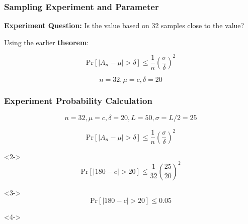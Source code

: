 \documentclass{beamer}
\begin{document}
\begin{frame}
  \frametitle{Sampling Experiment and Parameter}

  {\bf Experiment Question:} Is the  value based on
  32 samples close to the  value?

  \vfill

  Using the earlier {\bf theorem}:
  {\larger

    \begin{equation*}
      \text{Pr}[|A_n - \mu| > \delta] \leq
      \frac{1}{n}\left(\frac{\sigma}{\delta}\right)^2
    \end{equation*}

    \medskip
    
    \begin{equation*}
      n = 32, \mu = c, \delta = 20
    \end{equation*}

    \bigskip
    
    \begin{center}
    \end{center}
  }
\end{frame}

\begin{frame}
  \frametitle{Experiment Probability Calculation}

  {\larger
    \begin{equation*}
      n = 32, \mu = c, \delta = 20, L = 50, \sigma = L/2 = 25
    \end{equation*}

    \begin{equation*}
      \text{Pr}[|A_n - \mu| > \delta] \leq
      \frac{1}{n}\left(\frac{\sigma}{\delta}\right)^2
    \end{equation*}

    \begin{onlyenv}<2->
    \begin{equation*}
      \text{Pr}[|180 - c| > 20] \leq
      \frac{1}{32}\left(\frac{25}{20}\right)^2
    \end{equation*}
    \end{onlyenv}

    \begin{onlyenv}<3->
    \begin{equation*}
      \text{Pr}[|180 - c| > 20] \leq 0.05
    \end{equation*}
    \end{onlyenv}

    \begin{onlyenv}<4->
    \end{onlyenv}
    }
\end{frame}
\end{document}
